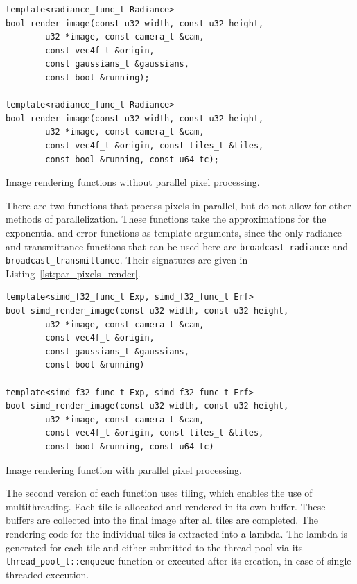 \documentclass[a4paper, 11pt]{memoir}
\begin{document}
    \begin{listing}[t]
        \begin{verbatim}
template<radiance_func_t Radiance>
bool render_image(const u32 width, const u32 height,
        u32 *image, const camera_t &cam,
        const vec4f_t &origin,
        const gaussians_t &gaussians,
        const bool &running);

template<radiance_func_t Radiance>
bool render_image(const u32 width, const u32 height,
        u32 *image, const camera_t &cam,
        const vec4f_t &origin, const tiles_t &tiles,
        const bool &running, const u64 tc);
        \end{verbatim}
        \caption{Image rendering functions without parallel pixel processing.}
        \label{lst:seq_pixels_render}
    \end{listing}

    There are two functions that process pixels in parallel, but do not allow for other methods of parallelization. These
    functions take the approximations for the exponential and error functions as template arguments, since the only
    \gls{radiance} and \gls{transmittance} functions that can be used here are \texttt{broadcast_radiance} and
    \texttt{broadcast_transmittance}. Their signatures are given in Listing~\ref{lst:par_pixels_render}.

    \begin{listing}[t]
        \begin{verbatim}
template<simd_f32_func_t Exp, simd_f32_func_t Erf>
bool simd_render_image(const u32 width, const u32 height,
        u32 *image, const camera_t &cam,
        const vec4f_t &origin,
        const gaussians_t &gaussians,
        const bool &running)

template<simd_f32_func_t Exp, simd_f32_func_t Erf>
bool simd_render_image(const u32 width, const u32 height,
        u32 *image, const camera_t &cam,
        const vec4f_t &origin, const tiles_t &tiles,
        const bool &running, const u64 tc)
        \end{verbatim}
        \caption{Image rendering function with parallel pixel processing.}
        \label{lst:par_pixels_render}
    \end{listing}

    The second version of each function uses tiling, which enables the use of multithreading. Each tile is allocated and
    rendered in its own buffer. These buffers are collected into the final image after all tiles are completed. The
    rendering code for the individual tiles is extracted into a lambda. The lambda is generated for each tile and either
    submitted to the thread pool via its \texttt{thread_pool_t::enqueue} function or executed after its creation,
    in case of single threaded execution.
\end{document}
